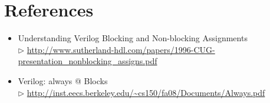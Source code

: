 \documentclass[a4paper,10pt]{article}
\theoremstyle{mytheor}
\newcommand{\amurl}[1]{%
  {\color{blue}\url{#1}}
}
\begin{document}
\section*{References}
\begin{itemize}
  \small
\item Understanding Verilog Blocking and Non-blocking Assignments
  \\$\rhd$
  \amurl{http://www.sutherland-hdl.com/papers/1996-CUG-presentation_nonblocking_assigns.pdf}
\item Verilog: always @ Blocks \\$\rhd$
  \amurl{http://inst.eecs.berkeley.edu/~cs150/fa08/Documents/Always.pdf}
\end{itemize}
\end{document}
